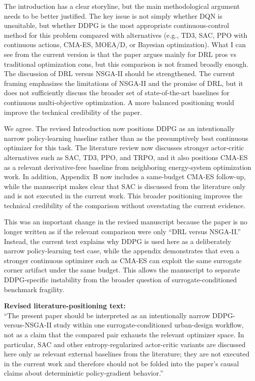 \begin{ReviewerComment}
The introduction has a clear storyline, but the main methodological argument needs to be better justified. The key issue is not simply whether DQN is unsuitable, but whether DDPG is the most appropriate continuous-control method for this problem compared with alternatives (e.g., TD3, SAC, PPO with continuous actions, CMA-ES, MOEA/D, or Bayesian optimization). What I can see from the current version is that the paper argues mainly for DRL pros vs traditional optimization cons, but this comparison is not framed broadly enough. The discussion of DRL versus NSGA-II should be strengthened. The current framing emphasizes the limitations of NSGA-II and the promise of DRL, but it does not sufficiently discuss the broader set of state-of-the-art baselines for continuous multi-objective optimization. A more balanced positioning would improve the technical credibility of the paper.
\end{ReviewerComment}
%
\begin{Answer}
We agree. The revised Introduction now positions DDPG as an intentionally narrow policy-learning baseline rather than as the presumptively best continuous optimizer for this task. The literature review now discusses stronger actor-critic alternatives such as SAC, TD3, PPO, and TRPO, and it also positions CMA-ES as a relevant derivative-free baseline from neighboring energy-system optimization work. In addition, Appendix~B now includes a same-budget CMA-ES follow-up, while the manuscript makes clear that SAC is discussed from the literature only and is not executed in the current work. This broader positioning improves the technical credibility of the comparison without overstating the current evidence.

This was an important change in the revised manuscript because the paper is no longer written as if the relevant comparison were only ``DRL versus NSGA-II.'' Instead, the current text explains why DDPG is used here as a deliberately narrow policy-learning test case, while the appendix demonstrates that even a stronger continuous optimizer such as CMA-ES can exploit the same surrogate corner artifact under the same budget. This allows the manuscript to separate DDPG-specific instability from the broader question of surrogate-conditioned benchmark fragility.
\end{Answer}
\begin{RevisionExcerpt}
\noindent\textbf{Revised literature-positioning text:}\\
``The present paper should be interpreted as an intentionally narrow DDPG-versus-NSGA-II study within one surrogate-conditioned urban-design workflow, not as a claim that the compared pair exhausts the relevant optimizer space. In particular, SAC and other entropy-regularized actor-critic variants are discussed here only as relevant external baselines from the literature; they are not executed in the current work and therefore should not be folded into the paper's causal claims about deterministic policy-gradient behavior.''
\end{RevisionExcerpt}

